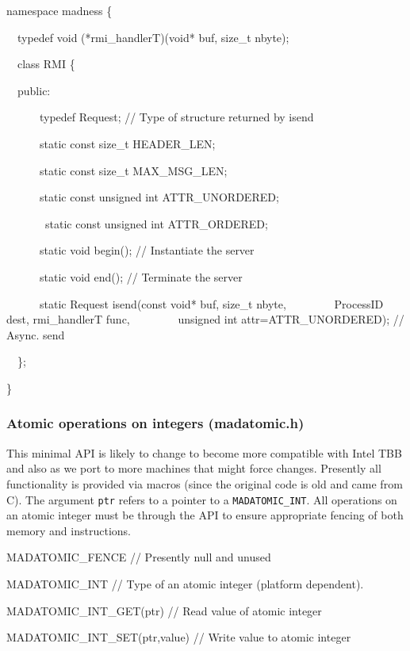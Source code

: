 \documentclass[letterpaper]{article}
\begin{document}
{\ttfamily
namespace madness \{}

{\ttfamily
\ \ typedef void (*rmi\_handlerT)(void* buf, size\_t nbyte);}

{\ttfamily
\ \ class RMI \{}

{\ttfamily
\ \ public:}

{\ttfamily
\ \ \ \ \ \ typedef Request; // Type of structure returned by isend}

{\ttfamily
\ \ \ \ \ \ static const size\_t HEADER\_LEN;}

{\ttfamily
\ \ \ \ \ \ static const size\_t MAX\_MSG\_LEN;}

{\ttfamily
\ \ \ \ \ \ static const unsigned int ATTR\_UNORDERED;}

{\ttfamily
\ \ \ \ \ \ \ static const unsigned int ATTR\_ORDERED;}

{\ttfamily
\ \ \ \ \ \ static void begin(); // Instantiate the server}

{\ttfamily
\ \ \ \ \ \ static void end(); // Terminate the server}

{\ttfamily
\ \ \ \ \ \ static Request isend(const void* buf, size\_t nbyte, \newline
\ \ \ \ \ \ \ \ ProcessID dest, rmi\_handlerT func, \newline
\ \ \ \ \ \ \ \ unsigned int attr=ATTR\_UNORDERED); // Async. send}

{\ttfamily
\ \ \};}

{\ttfamily
\}}

\subsubsection{Atomic operations on integers (madatomic.h)}
This minimal API is likely to change to become more compatible with Intel TBB and also as we port to more machines that
might force changes. Presently all functionality is provided via macros (since the original code is old and came from
C). The argument \texttt{ptr} refers to a pointer to a \texttt{MADATOMIC\_INT}. All operations on an atomic integer
must be through the API to ensure appropriate fencing of both memory and instructions. 

{\ttfamily
MADATOMIC\_FENCE // Presently null and unused}

{\ttfamily
MADATOMIC\_INT // Type of an atomic integer (platform dependent).}

{\ttfamily
MADATOMIC\_INT\_GET(ptr) // Read value of atomic integer}

{\ttfamily
MADATOMIC\_INT\_SET(ptr,value) // Write value to atomic integer}
\end{document}
